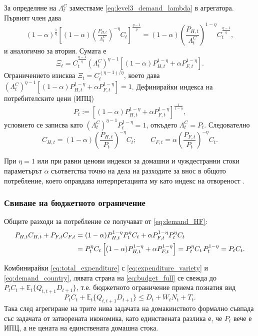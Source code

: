 За определяне на $\Lambda^{C}_t$ заместваме \eqref{eq:level3_demand_lambda} в агрегатора. Първият член дава
\[
(1-\alpha)^{\frac{1}{\eta}} \left[ (1-\alpha) \left( \tfrac{P_{H,t}}{\Lambda^{C}_t} \right)^{-\eta} C_t \right]^{\frac{\eta-1}{\eta}}
= (1-\alpha) \left( \frac{P_{H,t}}{\Lambda^{C}_t} \right)^{1-\eta} C_t^{\frac{\eta-1}{\eta}},
\]
и аналогично за втория. Сумата е
\[
\Xi_t = C_t^{\frac{\eta-1}{\eta}} \left( \Lambda^{C}_t \right)^{\eta-1} \left[ (1-\alpha) P_{H,t}^{1-\eta} + \alpha P_{F,t}^{1-\eta} \right].
\]
Ограничението изисква $\Xi_t = C_t^{(\eta-1)/\eta}$, което дава $\left( \Lambda^{C}_t \right)^{\eta-1}\left[ (1-\alpha) P_{H,t}^{1-\eta} + \alpha P_{F,t}^{1-\eta} \right] = 1$. Дефинирайки индекса на потребителските цени (ИПЦ)
\begin{equation}
P_t := \left[ (1-\alpha) P_{H,t}^{1-\eta} + \alpha P_{F,t}^{1-\eta} \right]^{\frac{1}{1-\eta}},
\label{eq:CPI}
\end{equation}
условието се записва като $\left( \Lambda^{C}_t \right)^{\eta-1} P_t^{1-\eta} = 1$, откъдето $\Lambda^{C}_t = P_t$. Следователно
\begin{equation}
C_{H,t} = (1-\alpha) \left( \frac{P_{H,t}}{P_t} \right)^{-\eta} C_t;
\qquad
C_{F,t} = \alpha \left( \frac{P_{F,t}}{P_t} \right)^{-\eta} C_t.
\label{eq:demand_HF}
\end{equation}

При $\eta = 1$ или при равни ценови индекси за домашни и чуждестранни стоки параметърът $\alpha$ съответства точно на дела на разходите за внос в общото потребление, което оправдава интерпретацията му като индекс на отвореност \parencite[с.~153]{Gali2008}.

\subsubsection*{Свиване на бюджетното ограничение}

Общите разходи за потребление се получават от \eqref{eq:demand_HF}:
\begin{align}
P_{H,t} C_{H,t} + P_{F,t} C_{F,t}
&= (1-\alpha) P_{H,t}^{1-\eta} P_t^{\eta} C_t + \alpha P_{F,t}^{1-\eta} P_t^{\eta} C_t \notag \\
&= P_t^{\eta} C_t \left[ (1-\alpha) P_{H,t}^{1-\eta} + \alpha P_{F,t}^{1-\eta} \right]
= P_t^{\eta} C_t\, P_t^{1-\eta} = P_t C_t.
\label{eq:total_expenditure}
\end{align}

Комбинирайки \eqref{eq:total_expenditure} с \eqref{eq:expenditure_variety} и \eqref{eq:demand_country}, лявата страна на \eqref{eq:budget_full} се свежда до $P_t C_t + \mathbb{E}_t\{Q_{t,t+1}D_{t+1}\}$, т.е. бюджетното ограничение приема познатия вид
\begin{equation}
P_t C_t + \mathbb{E}_t\{ Q_{t,t+1} D_{t+1} \} \le D_t + W_t N_t + T_t.
\label{eq:budget_compact}
\end{equation}
Така след агрегиране на трите нива задачата на домакинството формално съвпада със задачата от затворената икономика, като единствената разлика е, че $P_t$ вече е ИПЦ, а не цената на единствената домашна стока.

